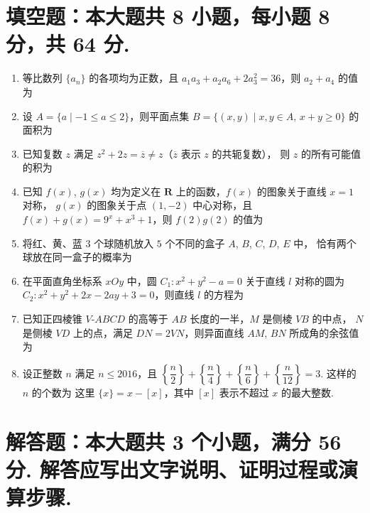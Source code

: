 \documentclass{chsmc}
\begin{document}
\section{填空题：本大题共 8 小题，每小题 8 分，共 64 分.}

\begin{enumerate}
	\item 等比数列 $\{a_n\}$ 的各项均为正数，且
		$a_1a_3 + a_2a_6 + 2a_3^2 = 36$，则 $a_2 + a_4$ 的值为 \blankline
	\item 设 $A = \{a\mid -1 \leqslant a \leqslant 2\}$，则平面点集
		$B = \{(x,y)\mid x,y \in A,\, x+y \geqslant 0\}$ 的面积为 \blankline
	\item 已知复数 $z$ 满足 $z^2 + 2z = \overline{z} \neq z$（$\overline{z}$ 表示 $z$ 的共轭复数），
		则 $z$ 的所有可能值的积为 \blankline
	\item 已知 $f(x)$, $g(x)$ 均为定义在 $\mathbf{R}$ 上的函数，$f(x)$ 的图象关于直线 $x = 1$ 对称，
		$g(x)$ 的图象关于点 $(1,-2)$ 中心对称，且
		$f(x) + g(x) = 9^x + x^3 + 1$，则 $f(2)g(2)$ 的值为 \blankline
	\item 将红、黄、蓝 $3$ 个球随机放入 $5$ 个不同的盒子 $A$, $B$, $C$, $D$, $E$ 中，
		恰有两个球放在同一盒子的概率为 \blankline
	\item 在平面直角坐标系 $xOy$ 中，圆
		$C_1\colon x^2 + y^2 - a = 0$ 关于直线 $l$ 对称的圆为
		$C_2\colon x^2 + y^2 + 2x - 2ay + 3 = 0$，则直线 $l$ 的方程为 \blankline
	\item 已知正四棱锥 $V$-$ABCD$ 的高等于 $AB$ 长度的一半，$M$ 是侧棱 $VB$ 的中点，
		$N$ 是侧棱 $VD$ 上的点，满足 $DN = 2VN$，则异面直线 $AM$, $BN$ 所成角的余弦值为 \blankline
	\item 设正整数 $n$ 满足 $n \leqslant 2016$，且
		$\left\{\dfrac{n}{2}\right\} + \left\{\dfrac{n}{4}\right\} + \left\{\dfrac{n}{6}\right\} + \left\{\dfrac{n}{12}\right\} = 3$.
		这样的 $n$ 的个数为 \blankline 这里 $\{x\} = x-[x]$，其中 $[x]$ 表示不超过 $x$ 的最大整数.
\end{enumerate}

\section{解答题：本大题共 3 个小题，满分 56 分. 解答应写出文字说明、证明过程或演算步骤.}
\end{document}
